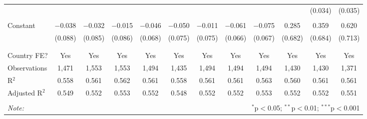 \begin{table}[!htbp]
\begin{tabular}{@{\extracolsep{5pt}}lccccccccccc}
  &  &  &  &  &  &  &  &  &  & (0.034) & (0.035) \\ 
  & & & & & & & & & & & \\ 
 Constant & $-$0.038 & $-$0.032 & $-$0.015 & $-$0.046 & $-$0.050 & $-$0.011 & $-$0.061 & $-$0.075 & 0.285 & 0.359 & 0.620 \\ 
  & (0.088) & (0.085) & (0.086) & (0.068) & (0.075) & (0.075) & (0.066) & (0.067) & (0.682) & (0.684) & (0.713) \\ 
  & & & & & & & & & & & \\ 
\hline \\[-1.8ex] 
Country FE? & Yes & Yes & Yes & Yes & Yes & Yes & Yes & Yes & Yes & Yes & Yes \\ 
Observations & 1,471 & 1,553 & 1,553 & 1,494 & 1,435 & 1,494 & 1,494 & 1,494 & 1,430 & 1,430 & 1,371 \\ 
R$^{2}$ & 0.558 & 0.561 & 0.562 & 0.561 & 0.558 & 0.561 & 0.561 & 0.563 & 0.560 & 0.561 & 0.561 \\ 
Adjusted R$^{2}$ & 0.549 & 0.552 & 0.553 & 0.552 & 0.548 & 0.552 & 0.552 & 0.553 & 0.552 & 0.552 & 0.551 \\ 
\hline 
\hline \\[-1.8ex] 
\textit{Note:}  & \multicolumn{11}{r}{$^{*}$p$<$0.05; $^{**}$p$<$0.01; $^{***}$p$<$0.001} \\ 
\end{tabular} 
\end{table} 
